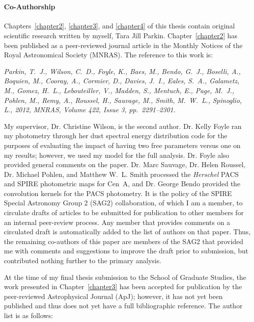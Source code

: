 \thispagestyle{fancy}

\textrm{}\\\\
\noindent\textbf{\huge\textsf{Co-Authorship}}\\\\

\noindent 
Chapters~\ref{chapter2}, \ref{chapter3}, and \ref{chapter4} of this thesis contain original scientific research written by myself, Tara Jill Parkin.  Chapter~\ref{chapter2} has been published as a peer-reviewed journal article in the Monthly Notices of the Royal Astronomical Society (MNRAS).  The reference to this work is:

\noindent \emph{Parkin, T.~J., Wilson, C.~D., Foyle, K., Baes, M., Bendo, G.~J., Boselli, A., Boquien, M., Cooray, A., Cormier, D., Davies, J.~I., Eales, S.~A., Galametz, M., Gomez, H.~L., Lebouteiller, V., Madden, S., Mentuch, E., Page, M.~J., Pohlen, M., Remy, A., Roussel, H., Sauvage, M., Smith, M.~W.~L., Spinoglio, L., 2012, MNRAS, Volume 422, Issue 3, pp.~2291--2301.}

\noindent My supervisor, Dr. Christine Wilson, is the second author.  Dr. Kelly Foyle ran my photometry through her dust spectral energy distribution code for the purposes of evaluating the impact of having two free parameters versus one on my results; however, we used my model for the full analysis.  Dr. Foyle also provided general comments on the paper.  Dr. Marc Sauvage, Dr. Helen Roussel, Dr. Michael Pohlen, and Matthew W.~L. Smith processed the \emph{Herschel} PACS and SPIRE photometric maps for Cen~A, and Dr. George Bendo provided the convolution kernels for the PACS photometry.  It is the policy of the SPIRE Special Astronomy Group 2 (SAG2) collaboration, of which I am a member, to circulate drafts of articles to be submitted for publication to other members for an internal peer-review process.  Any member that provides comments on a circulated draft is automatically added to the list of authors on that paper.  Thus, the remaining co-authors of this paper are members of the SAG2 that provided me with comments and suggestions to improve the draft prior to submission, but contributed nothing further to the primary analysis.  

At the time of my final thesis submission to the School of Graduate Studies, the work presented in Chapter~\ref{chapter3} has been accepted for publication by the peer-reviewed Astrophysical Journal (ApJ); however, it has not yet been published and thus does not yet have a full bibliographic reference.  The author list is as follows:

